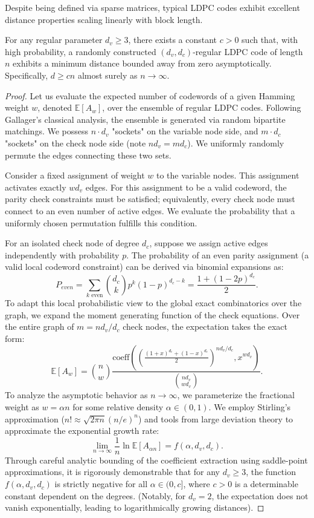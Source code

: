 Despite being defined via sparse matrices, typical LDPC codes exhibit excellent distance properties scaling linearly with block length.

\begin{lemma}
\label{lem:gallager_bound}
For any regular parameter $d_v \ge 3$, there exists a constant $c > 0$ such that, with high probability, a randomly constructed $(d_v, d_c)$-regular LDPC code of length $n$ exhibits a minimum distance bounded away from zero asymptotically. Specifically, $d \ge c n$ almost surely as $n \to \infty$.
\end{lemma}

\begin{proof}
Let us evaluate the expected number of codewords of a given Hamming weight $w$, denoted $\mathbb{E}[A_w]$, over the ensemble of regular LDPC codes. Following Gallager's classical analysis, the ensemble is generated via random bipartite matchings. We possess $n \cdot d_v$ "sockets" on the variable node side, and $m \cdot d_c$ "sockets" on the check node side (note $n d_v = m d_c$). We uniformly randomly permute the edges connecting these two sets.

Consider a fixed assignment of weight $w$ to the variable nodes. This assignment activates exactly $w d_v$ edges. For this assignment to be a valid codeword, the parity check constraints must be satisfied; equivalently, every check node must connect to an even number of active edges. We evaluate the probability that a uniformly chosen permutation fulfills this condition.

For an isolated check node of degree $d_c$, suppose we assign active edges independently with probability $p$. The probability of an even parity assignment (a valid local codeword constraint) can be derived via binomial expansions as:
\[
P_{even} = \sum_{k \text{ even}} \binom{d_c}{k} p^k (1-p)^{d_c-k} = \frac{1 + (1-2p)^{d_c}}{2}.
\]
To adapt this local probabilistic view to the global exact combinatorics over the graph, we expand the moment generating function of the check equations. Over the entire graph of $m = nd_v/d_c$ check nodes, the expectation takes the exact form:
\[
\mathbb{E}[A_w] = \binom{n}{w} \frac{\text{coeff}\left( \left(\frac{(1+x)^{d_c} + (1-x)^{d_c}}{2}\right)^{nd_v/d_c}, x^{w d_v} \right)}{\binom{nd_v}{w d_v}}.
\]
To analyze the asymptotic behavior as $n \to \infty$, we parameterize the fractional weight as $w = \alpha n$ for some relative density $\alpha \in (0, 1)$. We employ Stirling's approximation ($n! \approx \sqrt{2\pi n} (n/e)^n$) and tools from large deviation theory to approximate the exponential growth rate:
\[
\lim_{n \to \infty} \frac{1}{n} \ln \mathbb{E}[A_{\alpha n}] = f(\alpha, d_v, d_c).
\]
Through careful analytic bounding of the coefficient extraction using saddle-point approximations, it is rigorously demonstrable that for any $d_v \ge 3$, the function $f(\alpha, d_v, d_c)$ is strictly negative for all $\alpha \in (0, c]$, where $c > 0$ is a determinable constant dependent on the degrees. (Notably, for $d_v = 2$, the expectation does not vanish exponentially, leading to logarithmically growing distances).


\end{proof}
